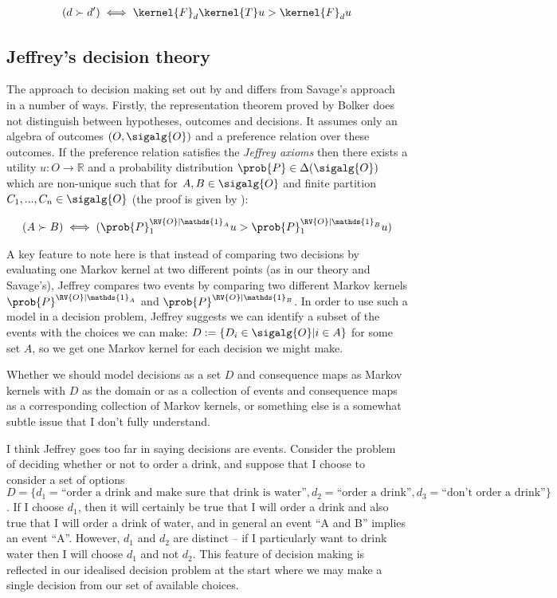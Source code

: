 \begin{align}
    (d\succ d')\iff \kernel{F}_d\kernel{T} u > \kernel{F}_d u\label{eq:savage_utility2}
\end{align}


\subsection{Jeffrey's decision theory}

The approach to decision making set out by \citet{jeffrey_logic_1990} and \citet{bolker_functions_1966} differs from Savage's approach in a number of ways. Firstly, the representation theorem proved by Bolker does not distinguish between hypotheses, outcomes and decisions. It assumes only an algebra of outcomes $(O,\sigalg{O})$ and a preference relation over these outcomes. If the preference relation satisfies the \emph{Jeffrey axioms} then there exists a utility $u:O\to\mathbb{R}$ and a probability distribution $\prob{P}\in \Delta(\sigalg{O})$ which are non-unique such that for $A,B\in \sigalg{O}$ and finite partition $C_1,...,C_n\in \sigalg{O}$ (the proof is given by \citet{bolker_functions_1966}):

\begin{align}
    (A \succ B) \iff (\prob{P}^{\RV{O}|\mathds{1}_A}_1u>\prob{P}^{\RV{O}|\mathds{1}_B}_1u) \label{eq:ev_dec_theory}
\end{align}

A key feature to note here is that instead of comparing two decisions by evaluating one Markov kernel at two different points (as in our theory and Savage's), Jeffrey compares two events by comparing two different Markov kernels $\prob{P}^{\RV{O}|\mathds{1}_A}$ and $\prob{P}^{\RV{O}|\mathds{1}_B}$.  In order to use such a model in a decision problem, Jeffrey suggests we can identify a subset of the events with the choices we can make: $D:=\{D_i\in \sigalg{O}|i\in A\}$ for some set $A$, so we get one Markov kernel for each decision we might make. 

Whether we should model decisions as a set $D$ and consequence maps as Markov kernels with $D$ as the domain or as a collection of events and consequence maps as a corresponding collection of Markov kernels, or something else is a somewhat subtle issue that I don't fully understand.

I think Jeffrey goes too far in saying decisions are events. Consider the problem of deciding whether or not to order a drink, and suppose that I choose to consider a set of options $D=\{d_1=\text{``order a drink and make sure that drink is water''}, d_2=\text{``order a drink''}, d_3=\text{``don't order a drink''}\}$. If I choose $d_1$, then it will certainly be true that I will order a drink and also true that I will order a drink of water, and in general an event ``A and B'' implies an event ``A''. However, $d_1$ and $d_2$ are distinct -- if I particularly want to drink water then I will choose $d_1$ and not $d_2$. This feature of decision making is reflected in our idealised decision problem at the start where we may make a single decision from our set of available choices.

